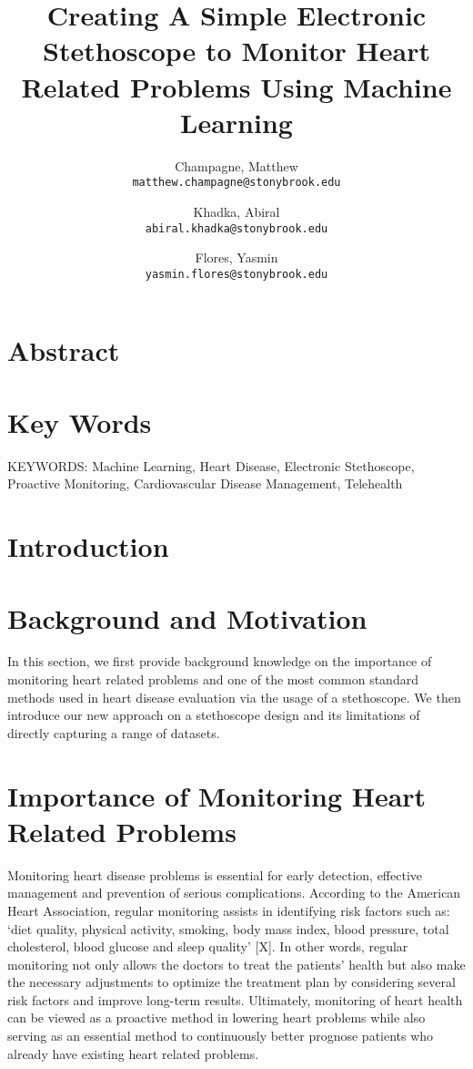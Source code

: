\documentclass[twocolumn]{article}
\begin{document}
\title{Creating A Simple Electronic Stethoscope to Monitor Heart Related Problems Using Machine Learning}
\author{
  Champagne, Matthew \\
  \texttt{matthew.champagne@stonybrook.edu}
  \and
  Khadka, Abiral \\
  \texttt{abiral.khadka@stonybrook.edu}
  \and
  Flores, Yasmin \\
  \texttt{yasmin.flores@stonybrook.edu}
}

\maketitle
\section{Abstract} 

\section{Key Words} 
KEYWORDS: Machine Learning, Heart Disease, Electronic Stethoscope, Proactive Monitoring, Cardiovascular Disease Management, Telehealth 

\section{Introduction}

\section{Background and Motivation} 
In this section, we first provide background knowledge on the importance of monitoring heart related problems 
and one of the most common standard methods used in heart disease evaluation via the usage 
of a stethoscope. We then introduce our new approach on a stethoscope design and its limitations 
of directly capturing a range of datasets.

\section{Importance of Monitoring Heart Related Problems} 
Monitoring heart disease problems is essential for early detection, effective management and prevention of serious complications. 
According to the American Heart Association, regular monitoring assists in identifying risk factors such as: 
‘diet quality, physical activity, smoking, body mass index, blood pressure, total cholesterol, blood glucose and sleep quality’ [X]. 
In other words, regular monitoring not only allows the doctors to treat the patients’ health 
but also make the necessary adjustments to optimize the treatment plan by considering several risk factors 
and improve long-term results. Ultimately, monitoring of heart health can be viewed as a proactive method 
in lowering heart problems while also serving as an essential method to continuously better prognose patients 
who already have existing heart related problems. 
\end{document}
